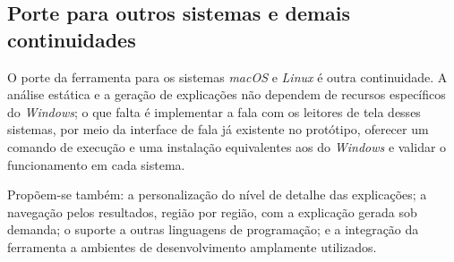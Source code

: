 \documentclass[
    12pt,                   %
    openright,              %
    oneside,                %
    a4paper,                %
    sumario=tradicional,    %
    english,                %
    brazil,                 %
    ]{abntex2}
\begin{document}
\subsection{Porte para outros sistemas e demais continuidades}

O porte da ferramenta para os sistemas \textit{macOS} e \textit{Linux} é outra continuidade. A análise estática e a geração de explicações não dependem de recursos específicos do \textit{Windows}; o que falta é implementar a fala com os leitores de tela desses sistemas, por meio da interface de fala já existente no protótipo, oferecer um comando de execução e uma instalação equivalentes aos do \textit{Windows} e validar o funcionamento em cada sistema.

Propõem-se também: a personalização do nível de detalhe das explicações; a navegação pelos resultados, região por região, com a explicação gerada sob demanda; o suporte a outras linguagens de programação; e a integração da ferramenta a ambientes de desenvolvimento amplamente utilizados.
\end{document}
